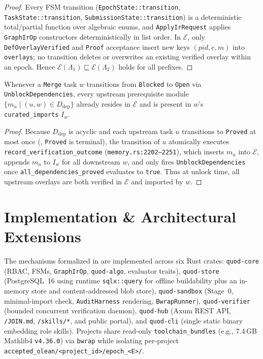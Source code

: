\documentclass[sigplan,nonacm,10pt]{acmart}
\newcommand{\Truth}{\mathcal{E}}
\newcommand{\Events}{\Lambda}
\newcommand{\code}[1]{\texttt{#1}}
\begin{document}
\begin{proof}
Every FSM transition (\code{EpochState::\-transition}, \code{TaskState::\-transition}, \code{SubmissionState::\-transition}) is a deterministic total/partial function over algebraic enums, and \code{ApplyIrRequest} applies \code{GraphIrOp} constructors deterministically in list order. In $\Truth$, only \code{DefOverlayVerified} and \code{Proof} acceptance insert new keys $(pid, e, m)$ into \code{overlays}; no transition deletes or overwrites an existing verified overlay within an epoch. Hence $\Truth(\Events_1) \sqsubseteq \Truth(\Events_2)$ holds for all prefixes.
\end{proof}

\begin{theorem}\label{thm:merge-unlock}
Whenever a \code{Merge} task $w$ transitions from \code{Blocked} to \code{Open} via \code{UnblockDependencies}, every upstream prerequisite module $\{m_u \mid (u, w) \in D_{\mathrm{dep}}\}$ already resides in $\Truth$ and is present in $w$'s \code{curated\_imports} $I_w$.
\end{theorem}

\begin{proof}
Because $D_{\mathrm{dep}}$ is acyclic and each upstream task $u$ transitions to \code{Proved} at most once (, \code{Proved} is terminal), the transition of $u$ atomically executes \code{record\_\-verification\_\-outcome} (\code{memory.rs:2202--2251}), which inserts $m_u$ into $\Truth$, appends $m_u$ to $I_w$ for all downstream $w$, and only fires \code{Unblock\-Dependencies} once \code{all\_\-dependencies\_\-proved} evaluates to \code{true}. Thus at unlock time, all upstream overlays are both verified in $\Truth$ and imported by $w$.
\end{proof}

\section{Implementation \& Architectural Extensions}\label{sec:impl}

The mechanisms formalized in  are implemented across six Rust crates: \code{quod-core} (RBAC, FSMs, \code{GraphIrOp}, \code{quod-algo}, evaluator traits), \code{quod-store} (PostgreSQL~16 using runtime \code{sqlx::query} for offline buildability plus an in-memory store and content-addressed blob store), \code{quod-sandbox} (Stage~0, minimal-import check, \code{AuditHarness} rendering, \code{BwrapRunner}), \code{quod-verifier} (bounded concurrent verification daemon), \code{quod-hub} (Axum REST API, \code{/JOIN.md}, \code{/skills/*}, and public portal), and \code{quod-cli} (single static binary embedding role skills). Projects share read-only \code{toolchain\_bundles} (e.g., 7.4\,GB Mathlib4 \code{v4.36.0}) via \code{bwrap} while isolating per-project \code{accepted\_olean/<project\_id>/epoch\_<E>/}.
\end{document}

